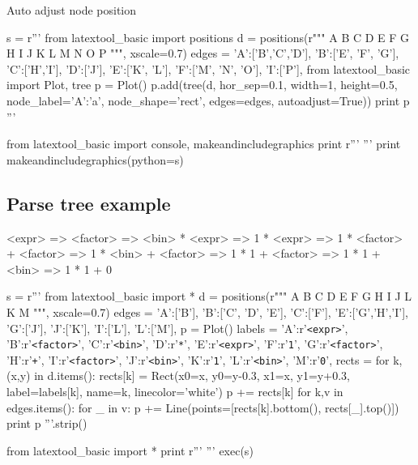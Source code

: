 \newpage
Auto adjust node position
\begin{python}
s = r'''
from latextool_basic import positions
d = positions(r"""
      A   
  B   C   D
E F G H   I J  
K L M N O P
""", xscale=0.7)
edges = {'A':['B','C','D'], 'B':['E', 'F', 'G'],
         'C':['H','I'],     'D':['J'],
         'E':['K', 'L'],    'F':['M', 'N', 'O'],
         'I':['P'],
}
from latextool_basic import Plot, tree
p = Plot()
p.add(tree(d, hor_sep=0.1,
           width=1, height=0.5, 
           node_label={'A':'a'}, node_shape='rect',
           edges=edges,
           autoadjust=True))
print p
'''

from latextool_basic import console, makeandincludegraphics
print r'''{\small
}''' %
print makeandincludegraphics(python=s)
\end{python}


\newpage
\subsection{Parse tree example}

\begin{console}
<expr> => <factor>
       => <bin> * <expr>
       => 1 * <expr>
       => 1 * <factor> + <factor>
       => 1 * <bin> + <factor>
       => 1 * 1 + <factor>
       => 1 * 1 + <bin>
       => 1 * 1 + 0
\end{console}

\begin{python}
s = r'''
from latextool_basic import *
d = positions(r"""
   A
   B
C  D  E
F   G H I
    J   L
    K   M
""", xscale=0.7)
edges = {'A':['B'],          'B':['C', 'D', 'E'], 'C':['F'],
         'E':['G','H','I'],  'G':['J'],           'J':['K'],
         'I':['L'],          'L':['M'],
        }
p = Plot()
labels = {'A':r'\texttt{<expr>}',   'B':r'\texttt{<factor>}',
          'C':r'\texttt{<bin>}',    'D':r'\texttt{*}',
          'E':r'\texttt{<expr>}',   'F':r'\texttt{1}',
          'G':r'\texttt{<factor>}', 'H':r'\texttt{+}',
          'I':r'\texttt{<factor>}', 'J':r'\texttt{<bin>}',
          'K':r'\texttt{1}',        'L':r'\texttt{<bin>}',
          'M':r'\texttt{0}',
        }
rects = {}
for k,(x,y) in d.items():
    rects[k] = Rect(x0=x, y0=y-0.3, x1=x, y1=y+0.3, label=labels[k],
                    name=k, linecolor='white')
    p += rects[k]
for k,v in edges.items():
    for _ in v:
        p += Line(points=[rects[k].bottom(), rects[_].top()])
print p
'''.strip()

from latextool_basic import *
print r'''{\small
}''' %
exec(s)
\end{python}






